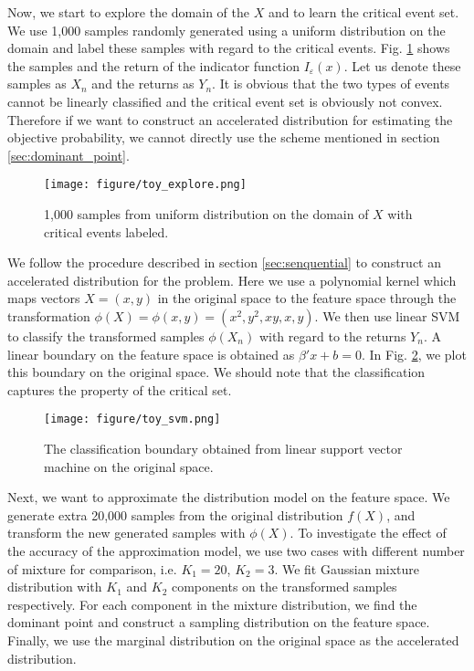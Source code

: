 \documentclass[letterpaper, 10 pt, journal]{IEEEtran}  %
\begin{document}
Now, we start to explore the domain of the $X$ and to learn the critical event set. We use 1,000 samples randomly generated using a uniform distribution on the domain and label these samples with regard to the critical events. Fig. \ref{fig:toy_explore} shows the samples and the return of the indicator function $I_\varepsilon(x)$. Let us denote these samples as $X_n$ and the returns as $Y_n$. It is obvious that the two types of events cannot be linearly classified and the critical event set is obviously not convex. Therefore if we want to construct an accelerated distribution for estimating the objective probability, we cannot directly use the scheme mentioned in section \ref{sec:dominant_point}.  

\begin{figure}[t]
	\centering
	\texttt{[image: figure/toy\_explore.png]}
	\caption{1,000 samples from uniform distribution on the domain of $X$ with critical events labeled.}
	\label{fig:toy_explore}
\end{figure}

We follow the procedure described in section \ref{sec:senquential} to construct an accelerated distribution for the problem. Here we use a polynomial kernel which maps vectors $X=(x,y)$ in the original space to the feature space through the transformation $\phi(X)=\phi(x,y)=(x^2,y^2,xy,x,y)$. We then use linear SVM to classify the transformed samples $\phi(X_n)$ with regard to the returns $Y_n$. A linear boundary on the feature space is obtained as $\beta'x+b=0$. In Fig. \ref{fig:toy_svm}, we plot this boundary on the original space. We should note that the classification captures the property of the critical set. 

\begin{figure}[t]
	\centering
	\texttt{[image: figure/toy\_svm.png]}
	\caption{The classification boundary obtained from linear support vector machine on the original space.}
	\label{fig:toy_svm}
\end{figure}

Next, we want to approximate the distribution model on the feature space. We generate extra 20,000 samples from the original distribution $f(X)$, and transform the new generated samples with $\phi(X)$. To investigate the effect of the accuracy of the approximation model, we use two cases with different number of mixture for comparison, i.e. $K_1=20$, $K_2=3$. We fit Gaussian mixture distribution with $K_1$ and $K_2$ components on the transformed samples respectively. For each component in the mixture distribution, we find the dominant point and construct a sampling distribution on the feature space. Finally, we use the marginal distribution on the original space as the accelerated distribution.
\end{document}
